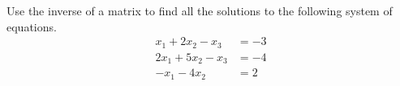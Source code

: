Use the inverse of a matrix to find all the solutions to the following system of equations.  %
\begin{align*}
x_1 + 2 x_2 - x_3 &= -3\\
2 x_1 + 5 x_2 - x_3 &= -4\\
-x_1 - 4 x_2 &= 2
\end{align*}